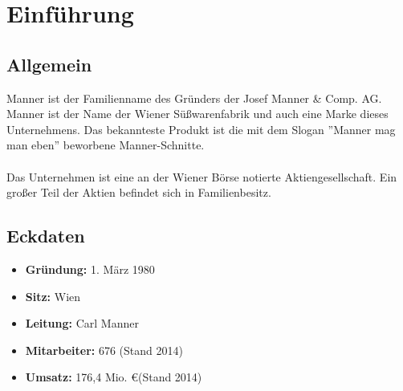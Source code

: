 \section{Einführung}
\subsection{Allgemein}
Manner ist der Familienname des Gründers der Josef Manner \& Comp. AG. Manner ist der Name der Wiener Süßwarenfabrik und auch eine Marke dieses Unternehmens. Das bekannteste Produkt ist die mit dem Slogan ''Manner mag man eben'' beworbene Manner-Schnitte. \cite{wiki_manner} \\\\
\noindent
Das Unternehmen ist eine an der Wiener Börse notierte Aktiengesellschaft. Ein großer Teil der Aktien befindet sich in Familienbesitz. \cite{wiki_manner}
\subsection{Eckdaten}
\begin{itemize}
\item \textbf{Gründung: } 1. März 1980
\item \textbf{Sitz: } Wien
\item \textbf{Leitung: } Carl Manner
\item \textbf{Mitarbeiter: } 676 (Stand 2014)
\item \textbf{Umsatz: } 176,4 Mio. \euro (Stand 2014) 
\end{itemize}